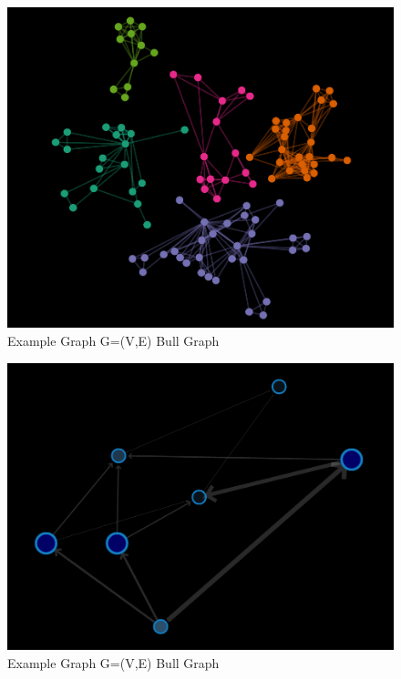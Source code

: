 \begin{figure}[H]
\centering
\includegraphics[scale=0.3]{t2.png}
\caption{Example Graph G=(V,E) Bull Graph}
\end{figure}

\begin{figure}[H]
\centering
\includegraphics[scale=0.3]{t3.png}
\caption{Example Graph G=(V,E) Bull Graph}
\end{figure}

